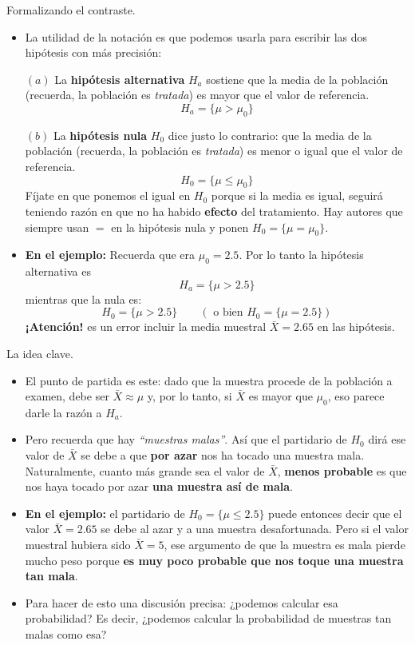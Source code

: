 \documentclass[
  9pt,
  ignorenonframetext,
]{beamer}
\begin{document}
\begin{frame}{Formalizando el contraste.}
\protect\hypertarget{formalizando-el-contraste.}{}

\begin{itemize}
\item
  La utilidad de la notación es que podemos usarla para escribir las dos
  hipótesis con más precisión:

  \((a)\) La \textbf{hipótesis alternativa} \(H_a\) sostiene que la
  media de la población (recuerda, la población es \emph{tratada}) es
  mayor que el valor de referencia. \[H_a = \{\mu > \mu_0\}\]

  \((b)\) La \textbf{hipótesis nula} \(H_0\) dice justo lo contrario:
  que la media de la población (recuerda, la población es
  \emph{tratada}) es menor o igual que el valor de referencia.
  \[H_0 = \{\mu \leq \mu_0\}\] Fíjate en que ponemos el igual en \(H_0\)
  porque si la media es igual, seguirá teniendo razón en que no ha
  habido \textbf{efecto} del tratamiento. Hay autores que siempre usan
  \(=\) en la hipótesis nula y ponen \(H_0 = \{\mu = \mu_0\}\).
\item
  \textbf{En el ejemplo:} Recuerda que era \(\mu_0 = 2.5\). Por lo tanto
  la hipótesis alternativa es \[H_a = \{\mu > 2.5\}\] mientras que la
  nula es:
  \[H_0 = \{\mu > 2.5\}\qquad (\text{ o bien } H_0 = \{\mu = 2.5\})\]
  \textbf{¡Atención!} es un error incluir la media muestral
  \(\bar X= 2.65\) en las hipótesis.
\end{itemize}

\end{frame}

\begin{frame}{La idea clave.}
\protect\hypertarget{la-idea-clave.}{}

\begin{itemize}
\item
  El punto de partida es este: dado que la muestra procede de la
  población a examen, debe ser \(\bar X\approx \mu\) y, por lo tanto, si
  \(\bar X\) es mayor que \(\mu_0\), eso parece darle la razón a
  \(H_a\).
\item
  Pero recuerda que hay \emph{``muestras malas''}. Así que el partidario
  de \(H_0\) dirá ese valor de \(\bar X\) se debe a que \textbf{por
  azar} nos ha tocado una muestra mala. Naturalmente, cuanto más grande
  sea el valor de \(\bar X\), \textbf{menos probable} es que nos haya
  tocado por azar \textbf{una muestra así de mala}.
\item
  \textbf{En el ejemplo:} el partidario de \(H_0 = \{\mu \leq 2.5\}\)
  puede entonces decir que el valor \(\bar X = 2.65\) se debe al azar y
  a una muestra desafortunada. Pero si el valor muestral hubiera sido
  \(\bar X = 5\), ese argumento de que la muestra es mala pierde mucho
  peso porque \textbf{es muy poco probable que nos toque una muestra tan
  mala}.
\item
  Para hacer de esto una discusión precisa: ¿podemos calcular esa
  probabilidad? Es decir, ¿podemos calcular la probabilidad de muestras
  tan malas como esa?
\end{itemize}

\end{frame}
\end{document}
